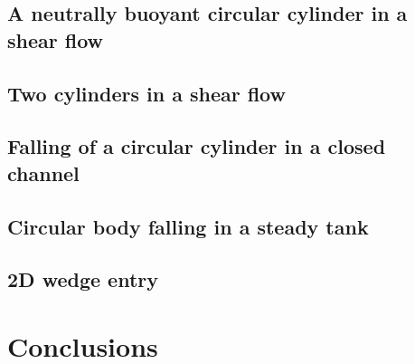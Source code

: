 \documentclass[preprint,12pt]{elsarticle}
\begin{document}
\FloatBarrier%
\subsection{A neutrally buoyant circular cylinder in a shear ﬂow}
\label{sec:res:hpf}

\citet{hashemi_modified_2012}


\FloatBarrier%
\subsection{Two cylinders in a shear ﬂow}
\label{sec:res:hpf}

\citet{xxx}


\FloatBarrier%
\subsection{Falling of a circular cylinder in a closed channel}
\label{sec:res:hpf}


\citet{hashemi_modified_2012}


\FloatBarrier%
\subsection{Circular body falling in a steady tank}
\label{sec:res:hpf}


\citet{hashemi_modified_2012}


\FloatBarrier%
\subsection{2D wedge entry}
\label{sec:res:hpf}


\citet{hashemi_modified_2012}


\FloatBarrier%
\section{Conclusions}
\label{sec:conclusions}
\end{document}
